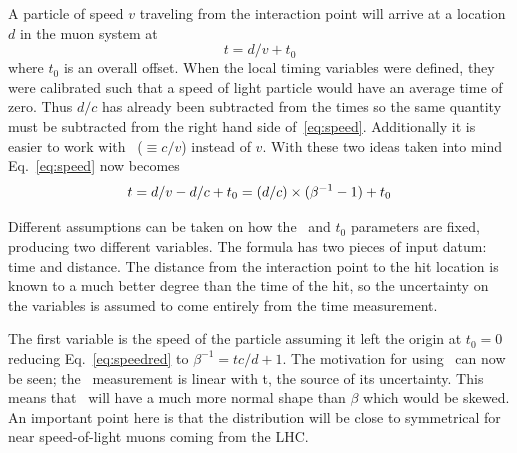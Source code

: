 A particle of speed $v$ traveling from the interaction point will arrive at a location $d$ in the muon system at
\begin{equation}
t = d/v + t_0
\label{eq:speed}
\end{equation}
where $t_0$ is an overall offset. When the local timing variables were defined, they were calibrated such that a speed of light particle would have an average time
of zero. Thus $d/c$ has already been subtracted from the times so the same quantity must be subtracted from the right hand side of~\ref{eq:speed}.
Additionally it is easier to work with \invbeta\ ($\equiv{c/v}$) instead of $v$. With these two ideas taken into mind Eq.~\ref{eq:speed} now becomes
\begin{equation}
t = d/v - d/c + t_0 = (d / c) \times (\beta^{-1} - 1) + t_0 \\
\label{eq:speedred}
\end{equation}

Different assumptions can be taken on how the \invbeta\ and $t_0$ parameters are fixed, producing two different variables.
The formula has two pieces of input datum: time and distance. The distance
from the interaction point to the hit location is known to a much better degree than the time of the hit, so the uncertainty on the variables
is assumed to come entirely from the time measurement.

The first variable is the speed of the particle assuming it left the origin at $t_0 = 0$ reducing Eq.~\ref{eq:speedred} to $\beta^{-1} = tc/d + 1$.
The motivation for using \invbeta\ can now be seen; the \invbeta\ measurement
is linear with t, the source of its uncertainty. This means that \invbeta\ will have a much more normal shape than $\beta$ which would be skewed.
An important point here is that the distribution will be close to symmetrical for near speed-of-light muons coming from the LHC.

